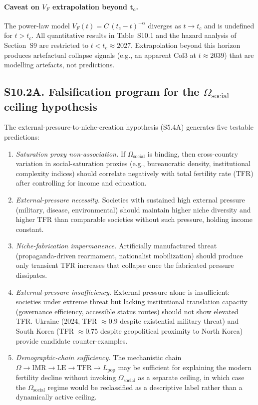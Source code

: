 \documentclass[11pt]{article}
\begin{document}
\paragraph{Caveat on $V_F$ extrapolation beyond $\boldsymbol{t_c}$.}
The power-law model $V_F(t) = C\,(t_c - t)^{-\alpha}$ diverges as
$t \to t_c$ and is undefined for $t > t_c$.  All quantitative results
in Table~S10.1 and the hazard analysis of Section~S9 are restricted
to $t < t_c \approx 2027$.  Extrapolation beyond this horizon produces
artefactual collapse signals (e.g., an apparent Col3 at $t \approx 2039$)
that are modelling artefacts, not predictions.

\subsection*{S10.2A. Falsification program for the $\Omega_{\mathrm{social}}$ ceiling hypothesis}

The external-pressure-to-niche-creation hypothesis (S5.4A) generates five testable predictions:

\begin{enumerate}
\item[\textbf{F1.}] \textit{Saturation proxy non-association.} If $\Omega_{\mathrm{social}}$ is binding, then cross-country variation in social-saturation proxies (e.g., bureaucratic density, institutional complexity indices) should correlate negatively with total fertility rate (TFR) after controlling for income and education.
\item[\textbf{F2.}] \textit{External-pressure necessity.} Societies with sustained high external pressure (military, disease, environmental) should maintain higher niche diversity and higher TFR than comparable societies without such pressure, holding income constant.
\item[\textbf{F3.}] \textit{Niche-fabrication impermanence.} Artificially manufactured threat (propaganda-driven rearmament, nationalist mobilization) should produce only transient TFR increases that collapse once the fabricated pressure dissipates.
\item[\textbf{F4.}] \textit{External-pressure insufficiency.} External pressure alone is insufficient: societies under extreme threat but lacking institutional translation capacity (governance efficiency, accessible status routes) should not show elevated TFR. Ukraine (2024, TFR $\approx 0.9$ despite existential military threat) and South Korea (TFR $\approx 0.75$ despite geopolitical proximity to North Korea) provide candidate counter-examples.
\item[\textbf{F5.}] \textit{Demographic-chain sufficiency.} The mechanistic chain $\Omega\to\mathrm{IMR}\to\mathrm{LE}\to\mathrm{TFR}\to L_{\mathrm{pop}}$ may be sufficient for explaining the modern fertility decline without invoking $\Omega_{\mathrm{social}}$ as a separate ceiling, in which case the $\Omega_{\mathrm{social}}$ regime would be reclassified as a descriptive label rather than a dynamically active ceiling.
\end{enumerate}
\end{document}
